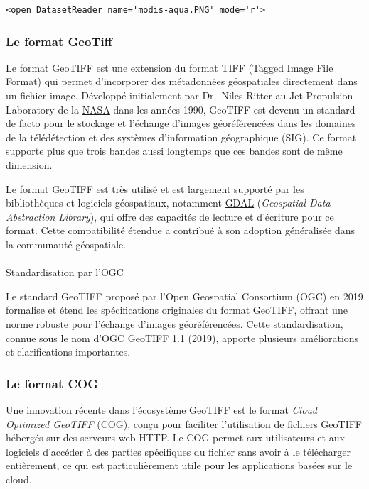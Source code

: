 \documentclass[
  11pt,
  letterpaper,
  open=any,
  twoside=false,
  french]{scrbook}
\makeatletter
\let\oldparagraph\paragraph
\renewcommand{\paragraph}{
    \@ifstar
      \xxxParagraphStar
      \xxxParagraphNoStar
  }
\newcommand{\xxxParagraphStar}[1]{\oldparagraph*{#1}\mbox{}}
\newcommand{\xxxParagraphNoStar}[1]{\oldparagraph{#1}\mbox{}}
\makeatother
\begin{document}
\begin{verbatim}
<open DatasetReader name='modis-aqua.PNG' mode='r'>
\end{verbatim}

\subsubsection{Le format GeoTiff}\label{le-format-geotiff}

Le format GeoTIFF est une extension du format TIFF (Tagged Image File
Format) qui permet d'incorporer des métadonnées géospatiales directement
dans un fichier image. Développé initialement par Dr.~Niles Ritter au
Jet Propulsion Laboratory de la
\href{https://www.earthdata.nasa.gov/esdis/esco/standards-and-practices/geotiff}{NASA}
dans les années 1990, GeoTIFF est devenu un standard de facto pour le
stockage et l'échange d'images géoréférencées dans les domaines de la
télédétection et des systèmes d'information géographique (SIG). Ce
format supporte plus que trois bandes aussi longtemps que ces bandes
sont de même dimension.

Le format GeoTIFF est très utilisé et est largement supporté par les
bibliothèques et logiciels géospatiaux, notamment
\href{https://gdal.org}{GDAL} (\emph{Geospatial Data Abstraction
Library}), qui offre des capacités de lecture et d'écriture pour ce
format. Cette compatibilité étendue a contribué à son adoption
généralisée dans la communauté géospatiale.

\paragraph{Standardisation par l'OGC}\label{standardisation-par-logc}

Le standard GeoTIFF proposé par l'Open Geospatial Consortium (OGC) en
2019 formalise et étend les spécifications originales du format GeoTIFF,
offrant une norme robuste pour l'échange d'images géoréférencées. Cette
standardisation, connue sous le nom d'OGC GeoTIFF 1.1 (2019), apporte
plusieurs améliorations et clarifications importantes.

\subsubsection{Le format COG}\label{le-format-cog}

Une innovation récente dans l'écosystème GeoTIFF est le format
\emph{Cloud Optimized GeoTIFF} (\href{http://cogeo.org/}{COG}), conçu
pour faciliter l'utilisation de fichiers GeoTIFF hébergés sur des
serveurs web HTTP. Le COG permet aux utilisateurs et aux logiciels
d'accéder à des parties spécifiques du fichier sans avoir à le
télécharger entièrement, ce qui est particulièrement utile pour les
applications basées sur le cloud.
\end{document}
